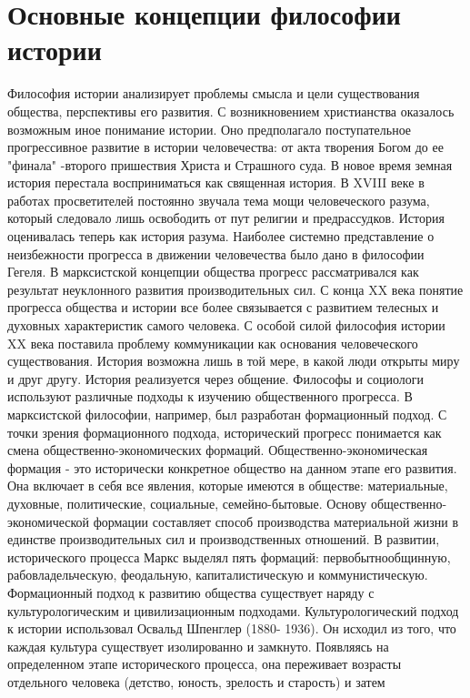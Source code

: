 \documentclass[12pt]{article}
\begin{document}
\section{Основные концепции философии истории}
Философия истории анализирует проблемы смысла и цели существования общества, перспективы его развития.
С  возникновением  христианства  оказалось  возможным  иное  понимание  истории.  Оно  предполагало
поступательное прогрессивное развитие в истории человечества: от акта творения Богом до ее "финала" -второго пришествия Христа и Страшного суда. В новое время земная история перестала восприниматься как
священная история. В XVIII веке в работах просветителей постоянно звучала тема мощи человеческого разума,
который следовало лишь освободить от пут религии и предрассудков. История оценивалась теперь как история
разума. Наиболее системно представление о неизбежности прогресса в движении человечества было дано в
философии Гегеля. В марксистской концепции общества прогресс рассматривался как результат неуклонного
развития производительных сил. С конца XX века понятие прогресса общества и истории все более связывается
с развитием телесных и духовных характеристик самого человека. С особой силой философия истории XX века
поставила проблему коммуникации как основания человеческого существования. История возможна лишь в той
мере, в какой люди открыты миру и друг другу. История реализуется через общение.
Философы и социологи используют различные подходы к изучению общественного прогресса. В марксистской
философии,  например,  был  разработан  формационный  подход.  С  точки  зрения  формационного  подхода,
исторический  прогресс  понимается  как  смена  общественно-экономических  формаций.  Общественно-экономическая формация - это исторически конкретное общество на данном этапе его развития. Она включает в  
себя все явления, которые имеются в обществе: материальные, духовные, политические, социальные, семейно-бытовые. Основу общественно-экономической формации составляет способ производства материальной жизни
в единстве производительных сил и производственных отношений. В развитии, исторического процесса Маркс
выделял  пять  формаций:  первобытнообщинную,  рабовладельческую,  феодальную,  капиталистическую  и
коммунистическую. Формационный подход к развитию общества существует наряду с культурологическим и
цивилизационным подходами.
Культурологический подход к истории использовал Освальд Шпенглер (1880- 1936). Он исходил из того, что
каждая  культура  существует  изолированно  и  замкнуто.  Появляясь  на  определенном  этапе  исторического
процесса,  она  переживает  возрасты  отдельного  человека  (детство,  юность,  зрелость  и  старость)  и  затем
\end{document}
